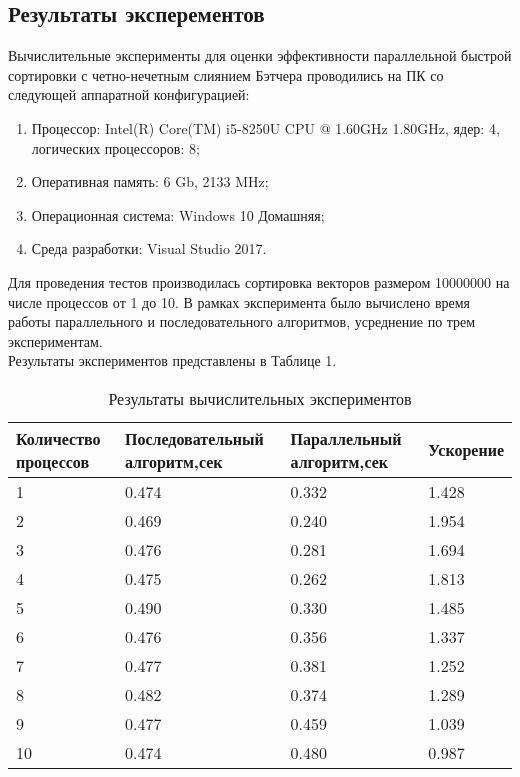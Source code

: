 \documentclass[a4paper]{report}
\begin{document}
\begin{center}
\section*{Результаты эксперементов}
\end{center}
\par Вычислительные эксперименты для оценки эффективности параллельной быстрой сортировки с четно-нечетным слиянием Бэтчера проводились на ПК со следующей аппаратной конфигурацией:
\begin{enumerate}
\item Процессор: Intel(R) Core(TM) i5-8250U CPU @ 1.60GHz 1.80GHz, ядер: 4, логических процессоров: 8;
\item Оперативная память: 6 Gb, 2133 MHz;
\item Операционная система: Windows 10 Домашняя;
\item Среда разработки: Visual Studio 2017.
\end{enumerate}
\par Для проведения тестов производилась сортировка векторов размером 10000000 на числе процессов от 1 до 10.
В рамках эксперимента было вычислено время работы параллельного и последовательного алгоритмов, усреднение по трем экспериментам.\\
Результаты экспериментов представлены в Таблице 1.
\begin{table}[!h]
\caption{Результаты вычислительных экспериментов}
\centering
\begin{tabular}{|p{3cm}|p{4cm}|p{4cm}|p{3cm}|}
\hline
Количество процессов & Последовательный алгоритм,сек & Параллельный алгоритм,сек & Ускорение  \\\hline
1  & 0.474 & 0.332 & 1.428  \\\hline
2  & 0.469 & 0.240 & 1.954  \\\hline
3  & 0.476 & 0.281 & 1.694  \\\hline
4  & 0.475 & 0.262 & 1.813  \\\hline
5  & 0.490 & 0.330 & 1.485  \\\hline
6  & 0.476 & 0.356 & 1.337  \\\hline
7  & 0.477 & 0.381 & 1.252  \\\hline
8  & 0.482 & 0.374 & 1.289  \\\hline
9  & 0.477 & 0.459 & 1.039  \\\hline
10 & 0.474 & 0.480 & 0.987  \\
\hline
\end{tabular}
\end{table}
\end{document}
